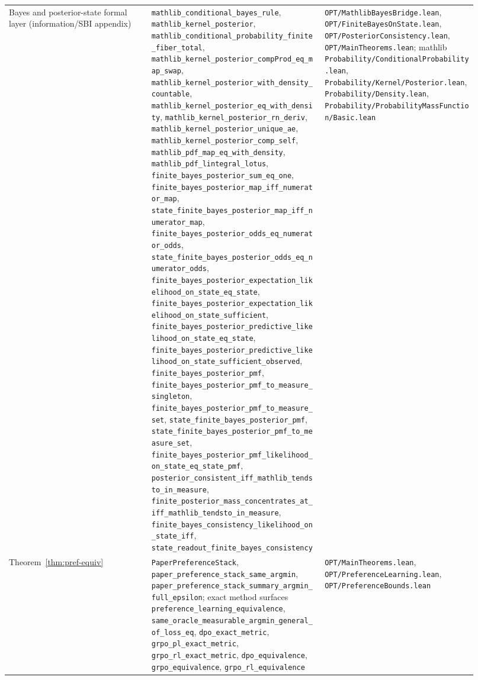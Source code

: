 {\begin{longtable}{p{0.28\linewidth}p{0.34\linewidth}p{0.30\linewidth}}
Bayes and posterior-state formal layer (information/SBI appendix) &
\texttt{mathlib\_conditional\_bayes\_rule}, \texttt{mathlib\_kernel\_posterior},
\nolinkurl{mathlib_conditional_probability_finite_fiber_total},
\nolinkurl{mathlib_kernel_posterior_compProd_eq_map_swap},
\nolinkurl{mathlib_kernel_posterior_with_density_countable},
\nolinkurl{mathlib_kernel_posterior_eq_with_density},
\nolinkurl{mathlib_kernel_posterior_rn_deriv},
\nolinkurl{mathlib_kernel_posterior_unique_ae},
\nolinkurl{mathlib_kernel_posterior_comp_self},
\texttt{mathlib\_pdf\_map\_eq\_with\_density},
\texttt{mathlib\_pdf\_lintegral\_lotus},
\texttt{finite\_bayes\_posterior\_sum\_eq\_one},
\nolinkurl{finite_bayes_posterior_map_iff_numerator_map},
\nolinkurl{state_finite_bayes_posterior_map_iff_numerator_map},
\nolinkurl{finite_bayes_posterior_odds_eq_numerator_odds},
\nolinkurl{state_finite_bayes_posterior_odds_eq_numerator_odds},
\nolinkurl{finite_bayes_posterior_expectation_likelihood_on_state_eq_state},
\nolinkurl{finite_bayes_posterior_expectation_likelihood_on_state_sufficient},
\nolinkurl{finite_bayes_posterior_predictive_likelihood_on_state_eq_state},
\nolinkurl{finite_bayes_posterior_predictive_likelihood_on_state_sufficient_observed},
\texttt{finite\_bayes\_posterior\_pmf},
\nolinkurl{finite_bayes_posterior_pmf_to_measure_singleton},
\nolinkurl{finite_bayes_posterior_pmf_to_measure_set},
\texttt{state\_finite\_bayes\_posterior\_pmf},
\nolinkurl{state_finite_bayes_posterior_pmf_to_measure_set},
\nolinkurl{finite_bayes_posterior_pmf_likelihood_on_state_eq_state_pmf},
\nolinkurl{posterior_consistent_iff_mathlib_tendsto_in_measure},
\nolinkurl{finite_posterior_mass_concentrates_at_iff_mathlib_tendsto_in_measure},
\nolinkurl{finite_bayes_consistency_likelihood_on_state_iff},
\texttt{state\_readout\_finite\_bayes\_consistency} &
\texttt{OPT/MathlibBayesBridge.lean}, \texttt{OPT/FiniteBayesOnState.lean},
\texttt{OPT/PosteriorConsistency.lean}, \texttt{OPT/MainTheorems.lean};
mathlib \texttt{Probability/ConditionalProbability.lean},
\texttt{Probability/Kernel/Posterior.lean},
\texttt{Probability/Density.lean},
\texttt{Probability/ProbabilityMassFunction/Basic.lean} \\

Theorem~\ref{thm:pref-equiv} &
\texttt{PaperPreferenceStack}, \texttt{paper\_preference\_stack\_same\_argmin}, \texttt{paper\_preference\_stack\_summary\_argmin\_full\_epsilon}; exact method surfaces \texttt{preference\_learning\_equivalence}, \texttt{same\_oracle\_measurable\_argmin\_general\_of\_loss\_eq}, \texttt{dpo\_exact\_metric}, \texttt{grpo\_pl\_exact\_metric}, \texttt{grpo\_rl\_exact\_metric}, \texttt{dpo\_equivalence}, \texttt{grpo\_equivalence}, \texttt{grpo\_rl\_equivalence} &
\texttt{OPT/MainTheorems.lean}, \texttt{OPT/PreferenceLearning.lean}, \texttt{OPT/PreferenceBounds.lean} \\


\end{longtable}}
